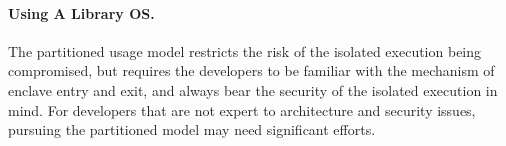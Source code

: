 %



\paragraph{Using A Library OS.}
 
The partitioned usage model restricts the risk of the isolated execution being compromised,
but requires the developers to be familiar with
the mechanism of enclave entry and exit,
and always bear the security of the isolated execution in mind.
For developers that are not expert to architecture and security issues,
pursuing the partitioned model may need significant efforts.   

